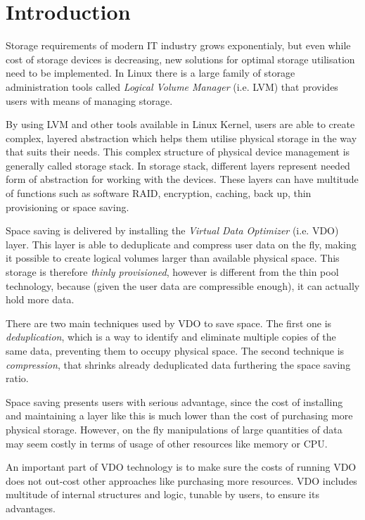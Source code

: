 \documentclass[
  color, %
  table, %
  lof,   %
  lot,   %
]{fithesis3}
\begin{document}
\chapter{Introduction}
Storage requirements of modern IT industry grows exponentialy, but even while cost of storage devices is decreasing, new solutions for optimal storage utilisation need to be implemented. In Linux there is a large family of storage administration tools called \emph{Logical Volume Manager} (i.e. LVM) that provides users with means of managing storage.

By using LVM and other tools available in Linux Kernel, users are able to create complex, layered abstraction which helps them utilise physical storage in the way that suits their needs. This complex structure of physical device management is generally called storage stack. In storage stack, different layers represent needed form of abstraction for working with the devices. These layers can have multitude of functions such as software RAID, encryption, caching, back up, thin provisioning or space saving.

Space saving is delivered by installing the \emph{Virtual Data Optimizer} (i.e. VDO) layer. This layer is able to deduplicate and compress user data on the fly, making it possible to create logical volumes larger than available physical space. This storage is therefore \emph{thinly provisioned}, however is different from the thin pool technology, because (given the user data are compressible enough), it can actually hold more data.

There are two main techniques used by VDO to save space. The first one is \emph{deduplication}, which is a way to identify and eliminate multiple copies of the same data, preventing them to occupy physical space. The second technique is \emph{compression}, that shrinks already deduplicated data furthering the space saving ratio.

Space saving presents users with serious advantage, since the cost of installing and maintaining a layer like this is much lower than the cost of purchasing more physical storage. However, on the fly manipulations of large quantities of data may seem costly in terms of usage of other resources like memory or CPU.

An important part of VDO technology is to make sure the costs of running VDO does not out-cost other approaches like purchasing more resources. VDO includes multitude of internal structures and logic, tunable by users, to ensure its advantages.
\end{document}
